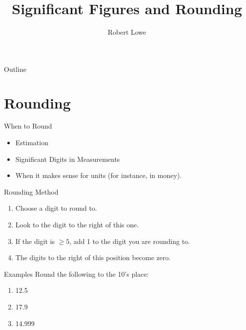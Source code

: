 \documentclass{beamer}
\title{Significant Figures and Rounding}
\author{Robert Lowe\\}
\institute[Maryville College] %
{
  Division of Mathematics and Computer Science\\
  Maryville College
}
\date[]{}
\begin{document}
\begin{frame}
  \titlepage
\end{frame}

\begin{frame}{Outline}
  \tableofcontents
\end{frame}





\section{Rounding}
\begin{frame}{When to Round}
\begin{itemize}[<+->]
    \item Estimation
    \item Significant Digits in Measurements
    \item When it makes sense for units (for instance, in money).
\end{itemize}
\end{frame}

\begin{frame}{Rounding Method}
\begin{enumerate}[<+->]
    \item Choose a digit to round to.
    \item Look to the digit to the right of this one.
    \item If the digit is $\geq 5$, add 1 to the digit you are rounding to.
    \item The digits to the right of this position become zero.
\end{enumerate}
\end{frame}

\begin{frame}{Examples}
Round the following to the 10's place:
\begin{enumerate}
    \item<1-> 12.5 
    \item<3-> 17.9 
    \item<5-> 14.999 
\end{enumerate}
\end{frame}
\end{document}
